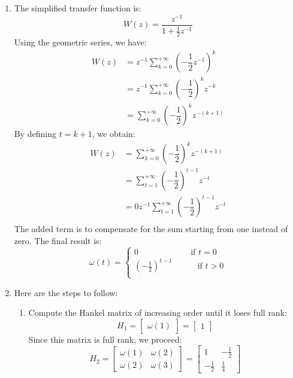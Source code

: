 \begin{enumerate}
    \item The simplified transfer function is:
        \[W(z)=\dfrac{z^{-1}}{1+\frac{1}{2}z^{-1}}\]
        Using the geometric series, we have:
        \begin{align*}
            W(z)    &=z^{-1}\sum_{k=0}^{+\infty}\left(-\dfrac{1}{2}z^{-1}\right)^k \\
                    &=z^{-1}\sum_{k=0}^{+\infty}\left(-\dfrac{1}{2}\right)^kz^{-k} \\
                    &=\sum_{k=0}^{+\infty}\left(-\dfrac{1}{2}\right)^kz^{-(k+1)}
        \end{align*}
        By defining $t=k+1$, we obtain:
        \begin{align*}
            W(z)    &=\sum_{k=0}^{+\infty}\left(-\dfrac{1}{2}\right)^kz^{-(k+1)} \\
                    &=\sum_{t=1}^{+\infty}\left(-\dfrac{1}{2}\right)^{t-1}z^{-t} \\
                    &=0z^{-1}\sum_{t=1}^{+\infty}\left(-\dfrac{1}{2}\right)^{t-1}z^{-t} \\
        \end{align*}
        The added term is to compensate for the sum starting from one instead of zero.
        The final result is:
        \[\omega(t)=\begin{cases}
            0 \qquad\qquad\qquad\: \text{if }t=0 \\
            \left(-\frac{1}{2}\right)^{t-1} \quad\qquad \text{if }t>0 \\
        \end{cases}\]
    \item Here are the steps to follow:
        \begin{enumerate}
            \item Compute the Hankel matrix of increasing order until it loses full rank:
                \[H_1=\begin{bmatrix} \omega(1) \end{bmatrix}=\begin{bmatrix} 1 \end{bmatrix}\]
                Since this matrix is full rank, we proceed:
                \[H_2=\begin{bmatrix} \omega(1) & \omega(2) \\ \omega(2) & \omega(3) \end{bmatrix}=\begin{bmatrix} 1 & -\frac{1}{2} \\ -\frac{1}{2} & \frac{1}{4} \end{bmatrix}\]

\end{enumerate}
\end{enumerate}
